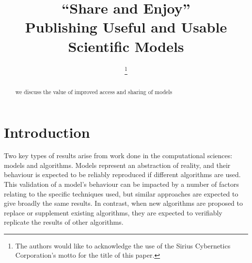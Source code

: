 \documentclass[conference]{IEEEtran}
\begin{document}

\title{``Share and Enjoy''\\Publishing Useful and Usable Scientific Models}

\author{
%
\thanks{The authors would like to acknowledge the use of the Sirius Cybernetics
  Corporation's motto for the title of this paper. }
\and
{}
}

\maketitle

\begin{abstract}
we discuss the value of improved access and sharing of models 
\end{abstract}

\IEEEpeerreviewmaketitle

\section{Introduction}
Two key types of results arise from work done in the computational
sciences: models and algorithms. Models represent an abstraction of
reality, and their behaviour is expected to be reliably reproduced if
different algorithms are used. This validation of a model's behaviour
can be impacted by a number of factors relating to the specific
techniques used, but similar approaches are expected to give broadly
the same results.  In contrast, when new algorithms are proposed to
replace or supplement existing algorithms, they are expected to
verifiably replicate the results of other algorithms.
\end{document}

